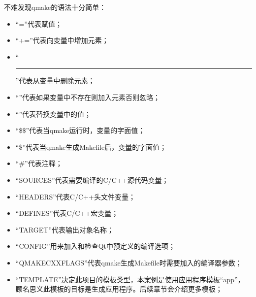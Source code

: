不难发现qmake的语法十分简单：
\begin{itemize}
\item “{\sourcefonttwo{}=}”代表赋值；
\item “{\sourcefonttwo{}+}{\sourcefonttwo{}=}”代表向变量中增加元素；
\item “\hspace{0.05em}\rule[0.7ex]{0.4em}{0.65pt}\hspace{0.05em}{\sourcefonttwo{}=}”代表从变量中删除元素；
\item “\raisebox{-0.35ex}{\sourcefonttwo{}*}{\sourcefonttwo{}=}”代表如果变量中不存在则加入元素否则忽略；
\item “\raisebox{0.16ex}{\sourcefonttwo\~{}}{\sourcefonttwo{}=}”代表替换变量中的值；
\item “{\sourcefonttwo\$}{\sourcefonttwo\$}”代表当qmake运行时，变量的字面值；
\item “{\sourcefonttwo\$}”代表当qmake生成Makefile后，变量的字面值；
\item “{\sourcefonttwo\#}”代表注释；
\item “SOURCES”代表需要编译的C/C{\sourcefonttwo{}+}{\sourcefonttwo{}+}源代码变量；
\item “HEADERS”代表C/C{\sourcefonttwo{}+}{\sourcefonttwo{}+}头文件变量；
\item “DEFINES”代表C/C{\sourcefonttwo{}+}{\sourcefonttwo{}+}宏变量；
\item “TARGET”代表输出对象名称；
\item “CONFIG”用来加入和检查Qt中预定义的编译选项；
\item “QMAKE\underline{\hspace{0.5em}}CXXFLAGS”代表qmake生成Makefile时需要加入的编译器参数；
\item “TEMPLATE”决定此项目的模板类型，本案例是使用应用程序模板“app”，
顾名思义此模板的目标是生成应用程序。后续章节会介绍更多模板；
\end{itemize}

